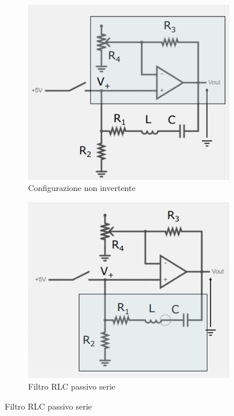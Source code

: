 \documentclass{article}
\begin{document}
\begin{figure}[h]
  \centering
  \begin{subfigure}{0.4 \linewidth}
    \includegraphics[width = \linewidth]{IM_circuito_risonante_serie_attivo_1}
    \caption{Configurazione non invertente}
  \end{subfigure}
  \begin{subfigure}{0.4 \linewidth}
    \includegraphics[width = \linewidth]{IM_circuito_risonante_serie_attivo_2}
    \caption{Filtro RLC passivo serie}
  \end{subfigure}
  \label{Schema_circuito_risonante_serie_attivo_analisi}
\end{figure}
\end{document}

